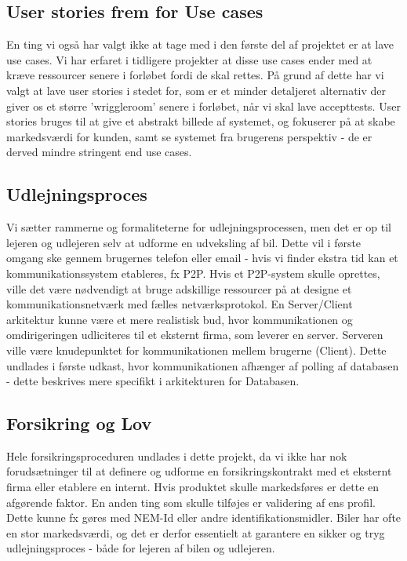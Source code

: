 \documentclass[Rapport/Rapport_main.tex]{subfiles}
\begin{document}
\subsection{User stories frem for Use cases}
En ting vi også har valgt ikke at tage med i den første del af projektet er at lave use cases. Vi har erfaret i tidligere projekter at disse use cases ender med at kræve ressourcer senere i forløbet fordi de skal rettes. På grund af dette har vi valgt at lave user stories i stedet for,  som er et minder detaljeret alternativ der giver os et større 'wriggleroom' senere i forløbet, når vi skal lave accepttests. User stories bruges til at give et abstrakt billede af systemet, og fokuserer på at skabe markedsværdi for kunden, samt se systemet fra brugerens perspektiv - de er derved mindre stringent end use cases. 

\subsection{Udlejningsproces}
Vi sætter rammerne og formaliteterne for udlejningsprocessen, men det er op til lejeren og udlejeren selv at udforme en udveksling af bil. Dette vil i første omgang ske gennem brugernes telefon eller email - hvis vi finder ekstra tid kan et kommunikationssystem etableres, fx P2P. Hvis et P2P-system skulle oprettes, ville det være nødvendigt at bruge adskillige ressourcer på at designe et kommunikationsnetværk med fælles netværksprotokol. En Server/Client arkitektur kunne være et mere realistisk bud, hvor kommunikationen og omdirigeringen udliciteres til et eksternt firma, som leverer en server. Serveren ville være knudepunktet for kommunikationen mellem brugerne (Client). Dette undlades i første udkast, hvor kommunikationen afhænger af polling af databasen - dette beskrives mere specifikt i arkitekturen for Databasen.  

\subsection{Forsikring og Lov}
Hele forsikringsproceduren undlades i dette projekt, da vi ikke har nok forudsætninger til at definere og udforme en forsikringskontrakt med et eksternt firma eller etablere en internt. Hvis produktet skulle markedsføres er dette en afgørende faktor. 
En anden ting som skulle tilføjes er validering af ens profil. Dette kunne fx gøres med NEM-Id eller andre identifikationsmidler. Biler har ofte en stor markedsværdi, og det er derfor essentielt at garantere en sikker og tryg udlejningsproces - både for lejeren af bilen og udlejeren.
\end{document}
